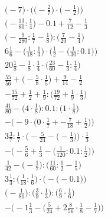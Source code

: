 \documentclass[8pt]{article}
\begin{document}
\begin{align}
\Big(-7\Big) \cdot \Big(\big(-\frac{2}{7}\big) \cdot \big(-\frac{1}{2}\big)\Big) \\
\big(-\frac{13}{80} : \frac{1}{4}\big) - 0.1 + \frac{7}{12} - \frac{1}{3} \\
\big(-\frac{9}{280} : \frac{1}{7} - \frac{1}{8}\big) : \big(\frac{7}{20} - \frac{1}{4}\big) \\
6\frac{1}{6} - \Big(\frac{1}{18} : \frac{1}{3}\Big) \cdot \Big(\frac{1}{2} - \big(\frac{1}{30} : 0.1\big)\Big) \\
20\frac{1}{8} - \frac{1}{8} \cdot \frac{1}{4} \cdot \big(\frac{23}{60} - \frac{1}{3} : \frac{1}{4}\big) \\
\frac{55}{56} + \big(-\frac{5}{8} \cdot \frac{1}{5}\big) + \frac{9}{14} - \frac{1}{2} \\
-\frac{35}{72} + \frac{1}{2} + \frac{1}{9} : \big(\frac{19}{72} + \frac{1}{9} \cdot \frac{1}{3}\big) \\
\frac{41}{80} - \big(4 \cdot \frac{1}{8}\big) : 0.1 : \big(1 \cdot \frac{1}{8}\big) \\
-\Big(-9 \cdot \big(0 \cdot \frac{1}{7} + -\frac{7}{18} + \frac{1}{2}\big)\Big) \\
3\frac{3}{7} : \frac{1}{7} \cdot \Big(-\frac{5}{24} - \big(-\frac{1}{3}\big)\Big) \cdot \frac{1}{3} \\
-\Big(-\frac{5}{6} + \frac{1}{3} - \big(\frac{1}{120} : 0.1 : \frac{1}{2}\big)\Big) \\
\frac{1}{42} - \big(-\frac{1}{7}\big) : \big(\frac{11}{60} : \frac{1}{2} - \frac{1}{5}\big) \\
3\frac{1}{3} : \Big(\frac{1}{18} : \frac{1}{6}\Big) \cdot \Big(-\big(-0.1\big)\Big) \\
\big(-\frac{1}{81}\big) : \big(\frac{3}{9} \cdot \frac{1}{3}\big) : \big(\frac{6}{9} \cdot \frac{1}{6}\big) \\
-\Big(-1\frac{1}{3} - \big(\frac{5}{24} + 2\frac{8}{56} \cdot \frac{1}{8} - \frac{1}{7}\big)\Big)
\end{align}
\end{document}
